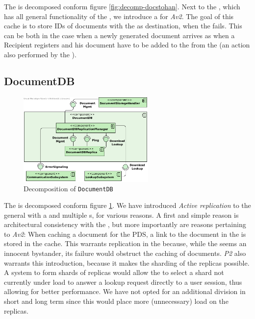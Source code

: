 The  is decomposed conform figure \ref{fig:decomp-docstohan}. Next to the , which has all general functionality of the , we introduce a  for \emph{Av2}. The goal of this cache is to store IDs of documents with the  as destination, when the  fails. This can be both in the case when a newly generated document arrives as when a Recipient registers and his document have to be added to the  from the  (an action also performed by the ).

\subsection{DocumentDB}
\begin{figure}[!htp]
    \centering
    \includegraphics[width=0.6\textwidth]{figures/DocumentDB.png}
    \caption{Decomposition of \texttt{DocumentDB}}\label{fig:decomp-docdb}
\end{figure}

The  is decomposed conform figure \ref{fig:decomp-docdb}. We have introduced \emph{Active replication} to the general  with a  and multiple s, for various reasons. A first and simple reason is architectural consistency with the , but more importantly are reasons pertaining to \emph{Av2}: When caching a document for the PDS, a link to the document in the  is stored in the cache. This warrants replication in the  because, while the  seems an innocent bystander, its failure would obstruct the caching of documents. \emph{P2} also warrants this introduction, because it makes the sharding of the replicas possible. A system to form shards of replicas would allow the  to select a shard not currently under load to answer a lookup request directly to a user session, thus allowing for better performance. We have not opted for an additional division in short and long term since this would place more (unnecessary) load on the replicas.

